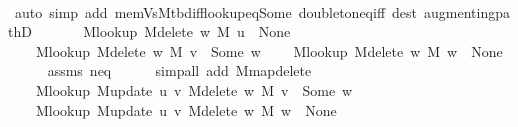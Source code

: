 \begin{isabellebody}
\ \ \ \ \isamarkupfalse%
\ {\isacharparenleft}{\kern0pt}auto\ simp\ add{\isacharcolon}{\kern0pt}\ mem{\isacharunderscore}{\kern0pt}Vs{\isacharunderscore}{\kern0pt}M{\isacharunderscore}{\kern0pt}tbd{\isacharunderscore}{\kern0pt}iff{\isacharunderscore}{\kern0pt}lookup{\isacharunderscore}{\kern0pt}eq{\isacharunderscore}{\kern0pt}Some\ doubleton{\isacharunderscore}{\kern0pt}eq{\isacharunderscore}{\kern0pt}iff\ dest{\isacharcolon}{\kern0pt}\ augmenting{\isacharunderscore}{\kern0pt}pathD{\isacharparenleft}{\kern0pt}{}{\isacharparenright}{\kern0pt}{\isacharparenright}{\kern0pt}\isanewline
\ \ \isamarkupfalse%
\isanewline
\ \ \ \ {\isachardoublequoteopen}M{\isacharunderscore}{\kern0pt}lookup\ {\isacharparenleft}{\kern0pt}M{\isacharunderscore}{\kern0pt}delete\ w\ M{\isacharparenright}{\kern0pt}\ u\ {\isacharequal}{\kern0pt}\ None{\isachardoublequoteclose}\isanewline
\ \ \ \ {\isachardoublequoteopen}M{\isacharunderscore}{\kern0pt}lookup\ {\isacharparenleft}{\kern0pt}M{\isacharunderscore}{\kern0pt}delete\ w\ M{\isacharparenright}{\kern0pt}\ v\ {\isacharequal}{\kern0pt}\ Some\ w{\isachardoublequoteclose}\isanewline
\ \ \ \ {\isachardoublequoteopen}M{\isacharunderscore}{\kern0pt}lookup\ {\isacharparenleft}{\kern0pt}M{\isacharunderscore}{\kern0pt}delete\ w\ M{\isacharparenright}{\kern0pt}\ w\ {\isacharequal}{\kern0pt}\ None{\isachardoublequoteclose}\isanewline
\ \ \ \ \isamarkupfalse%
\ assms{\isacharparenleft}{\kern0pt}{}{\isacharparenright}{\kern0pt}\ neq{\isacharparenleft}{\kern0pt}{}{\isacharminus}{\kern0pt}{}{\isacharparenright}{\kern0pt}\isanewline
\ \ \ \ \isamarkupfalse%
\ {\isacharparenleft}{\kern0pt}simp{\isacharunderscore}{\kern0pt}all\ add{\isacharcolon}{\kern0pt}\ M{\isachardot}{\kern0pt}map{\isacharunderscore}{\kern0pt}delete{\isacharparenright}{\kern0pt}\isanewline
\ \ \isamarkupfalse%
\isanewline
\ \ \ \ {\isachardoublequoteopen}M{\isacharunderscore}{\kern0pt}lookup\ {\isacharparenleft}{\kern0pt}M{\isacharunderscore}{\kern0pt}update\ u\ v\ {\isacharparenleft}{\kern0pt}M{\isacharunderscore}{\kern0pt}delete\ w\ M{\isacharparenright}{\kern0pt}{\isacharparenright}{\kern0pt}\ v\ {\isacharequal}{\kern0pt}\ Some\ w{\isachardoublequoteclose}\isanewline
\ \ \ \ {\isachardoublequoteopen}M{\isacharunderscore}{\kern0pt}lookup\ {\isacharparenleft}{\kern0pt}M{\isacharunderscore}{\kern0pt}update\ u\ v\ {\isacharparenleft}{\kern0pt}M{\isacharunderscore}{\kern0pt}delete\ w\ M{\isacharparenright}{\kern0pt}{\isacharparenright}{\kern0pt}\ w\ {\isacharequal}{\kern0pt}\ None{\isachardoublequoteclose}\isanewline

\end{isabellebody}

